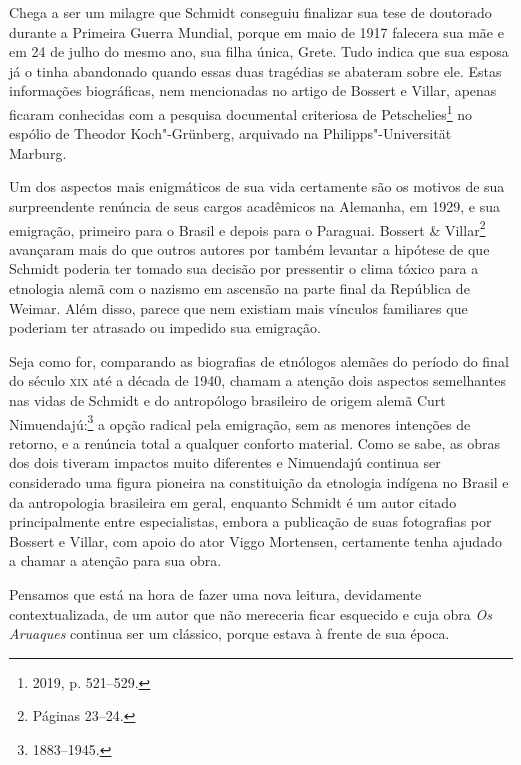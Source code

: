 Chega a ser um milagre que Schmidt conseguiu finalizar sua tese de
doutorado durante a Primeira Guerra Mundial, porque em maio de 1917
falecera sua mãe e em 24 de julho do mesmo ano, sua filha única, Grete.
Tudo indica que sua esposa já o tinha abandonado quando essas duas
tragédias se abateram sobre ele. Estas informações biográficas, nem
mencionadas no artigo de Bossert e Villar, apenas ficaram
conhecidas com a pesquisa documental criteriosa de Petschelies\footnote{2019, p.
521--529.} no espólio de Theodor Koch"-Grünberg, arquivado na
Philipps"-Universität Marburg.

Um dos aspectos mais enigmáticos de sua vida certamente são os motivos
de sua surpreendente renúncia de seus cargos acadêmicos na Alemanha, em
1929, e sua emigração, primeiro para o Brasil e depois para o Paraguai.
Bossert \& Villar\footnote{Páginas 23--24.} avançaram mais do que outros autores
por também levantar a hipótese de que Schmidt poderia ter tomado sua
decisão por pressentir o clima tóxico para a etnologia alemã com o
nazismo em ascensão na parte final da República de Weimar. Além disso,
parece que nem existiam mais vínculos familiares que poderiam ter
atrasado ou impedido sua emigração.

Seja como for, comparando as biografias de etnólogos alemães do período
do final do século \textsc{xix} até a década de 1940, chamam a atenção dois
aspectos semelhantes nas vidas de Schmidt e do antropólogo brasileiro de
origem alemã Curt Nimuendajú:\footnote{1883--1945.} a opção radical pela
emigração, sem as menores intenções de retorno, e a renúncia total a
qualquer conforto material. Como se sabe, as obras dos dois tiveram
impactos muito diferentes e Nimuendajú continua ser considerado uma
figura pioneira na constituição da etnologia indígena no Brasil e da
antropologia brasileira em geral, enquanto Schmidt é um autor citado
principalmente entre especialistas, embora a publicação de suas
fotografias por Bossert e Villar, com apoio do ator Viggo
Mortensen, certamente tenha ajudado a chamar a atenção para sua obra.

Pensamos que está na hora de fazer uma nova leitura, devidamente
contextualizada, de um autor que não mereceria ficar esquecido e cuja
obra \textit{Os Aruaques} continua ser um clássico, porque estava à
frente de sua época.


